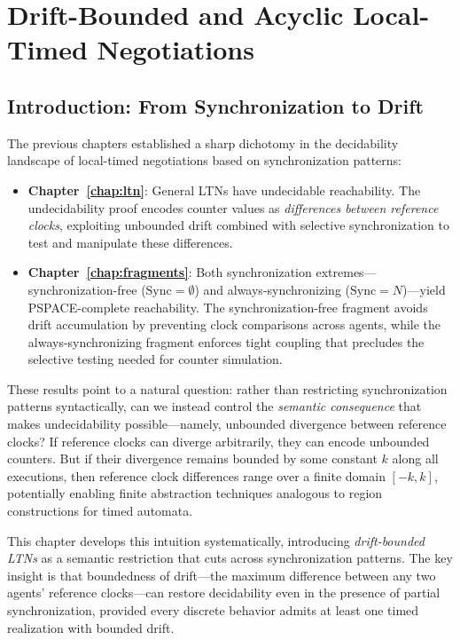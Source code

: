 \chapter{Drift-Bounded and Acyclic Local-Timed Negotiations}
\label{chap:drift-bounded}

\section{Introduction: From Synchronization to Drift}

The previous chapters established a sharp dichotomy in the decidability landscape of local-timed negotiations based on synchronization patterns:

\begin{itemize}
\item \textbf{Chapter~\ref{chap:ltn}}: General LTNs have undecidable reachability. The undecidability proof encodes counter values as \emph{differences between reference clocks}, exploiting unbounded drift combined with selective synchronization to test and manipulate these differences.

\item \textbf{Chapter~\ref{chap:fragments}}: Both synchronization extremes—synchronization-free ($\text{Sync} = \emptyset$) and always-synchronizing ($\text{Sync} = N$)—yield PSPACE-complete reachability. The synchronization-free fragment avoids drift accumulation by preventing clock comparisons across agents, while the always-synchronizing fragment enforces tight coupling that precludes the selective testing needed for counter simulation.
\end{itemize}

These results point to a natural question: rather than restricting synchronization patterns syntactically, can we instead control the \emph{semantic consequence} that makes undecidability possible—namely, unbounded divergence between reference clocks? If reference clocks can diverge arbitrarily, they can encode unbounded counters. But if their divergence remains bounded by some constant $k$ along all executions, then reference clock differences range over a finite domain $[-k, k]$, potentially enabling finite abstraction techniques analogous to region constructions for timed automata.

This chapter develops this intuition systematically, introducing \emph{drift-bounded LTNs} as a semantic restriction that cuts across synchronization patterns. The key insight is that boundedness of drift—the maximum difference between any two agents' reference clocks—can restore decidability even in the presence of partial synchronization, provided every discrete behavior admits at least one timed realization with bounded drift.

